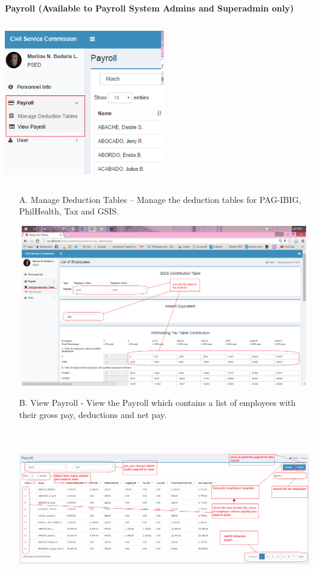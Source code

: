 \newpage
\noindent
\textbf{Payroll (Available to Payroll System Admins and Superadmin only) \\}
\begin{center}
	\includegraphics[width=7cm,height=7cm]{image/PS_um.png}
\end{center} 

\begin{enumerate}
	\item[A.] Manage Deduction Tables – Manage the deduction tables for PAG-IBIG, PhilHealth, Tax and GSIS.
	\begin{center}
		\includegraphics[width=14cm,height=7cm]{image/deducTables.png}
	\end{center} 
	\item[B.] View Payroll -  View the Payroll which contains a list of employees with their gross pay, deductions and net pay.
	\begin{center}
		\includegraphics[width=14cm,height=7cm]{image/Payroll.png}
	\end{center}
\end{enumerate}

